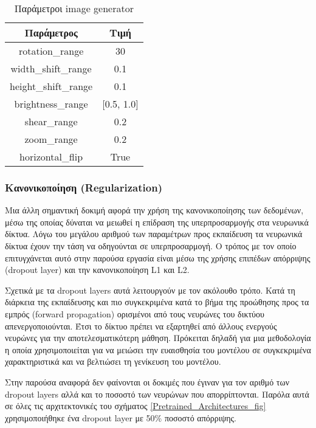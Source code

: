 \begin{table}[H]
\centering
\begin{tabular}{|c|c|}
\hline
Παράμετρος           & Τιμή           \\ \hline
rotation\_range      & 30             \\ \hline
width\_shift\_range  & 0.1            \\ \hline
height\_shift\_range & 0.1            \\ \hline
brightness\_range    & {[}0.5, 1.0{]} \\ \hline
shear\_range         & 0.2            \\ \hline
zoom\_range          & 0.2            \\ \hline
horizontal\_flip     & True           \\ \hline
\end{tabular}
\caption{Παράμετροι image generator}
\label{image_generator_table}
\end{table}

\subsubsection{Κανονικοποίηση (Regularization)}

Μια άλλη σημαντική δοκιμή αφορά την χρήση της κανονικοποίησης των δεδομένων, μέσω της οποίας δύναται να μειωθεί η επίδραση της υπερπροσαρμογής στα νευρωνικά δίκτυα. Λόγω του μεγάλου αριθμού των παραμέτρων προς εκπαίδευση τα νευρωνικά δίκτυα έχουν την τάση να οδηγούνται σε υπερπροσαρμογή.  Ο τρόπος με τον οποίο επιτυγχάνεται αυτό στην παρούσα εργασία είναι μέσω της χρήσης επιπέδων απόρριψης (dropout layer) και την κανονικοποίηση L1 και L2. 

Σχετικά με τα dropout layers αυτά λειτουργούν με τον ακόλουθο τρόπο. Κατά τη διάρκεια της εκπαίδευσης και πιο συγκεκριμένα κατά το βήμα της προώθησης προς τα εμπρός (forward propagation) ορισμένοι από τους νευρώνες του δικτύου απενεργοποιούνται. Έτσι το δίκτυο πρέπει να εξαρτηθεί από άλλους ενεργούς νευρώνες για την αποτελεσματικότερη μάθηση. Πρόκειται δηλαδή για μια μεθοδολογία η οποία χρησιμοποιείται για να μειώσει την ευαισθησία του μοντέλου σε συγκεκριμένα χαρακτηριστικά και να βελτιώσει τη γενίκευση του μοντέλου. 

Στην παρούσα αναφορά δεν φαίνονται οι δοκιμές που έγιναν για τον αριθμό των dropout layers αλλά και το ποσοστό των νευρώνων που απορρίπτονται. Παρόλα αυτά σε όλες τις αρχιτεκτονικές του σχήματος \ref{Pretrained_Architectures_fig} χρησιμοποιήθηκε ένα dropout layer με 50\% ποσοστό απόρριψης.

